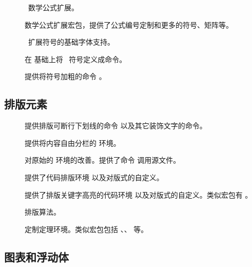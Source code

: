 \begin{description}
  \item[]  \AmS\ 数学公式扩展。
  \item[] 数学公式扩展宏包，提供了公式编号定制和更多的符号、矩阵等。
  \item[] \AmS\ 扩展符号的基础字体支持。
  \item[]  在  基础上将 \AmS\ 符号定义成命令。
  \item[]       提供将符号加粗的命令 。
\end{description}

\subsection{排版元素}\label{subsec:pkg-elements}

\begin{description}
  \item[]     提供排版可断行下划线的命令  以及其它装饰文字的命令。
  \item[] 提供将内容自由分栏的  环境。
  \item[] 对原始的  环境的改善。提供了命令  调用源文件。
  \item[] 提供了代码排版环境  以及对版式的自定义。
  \item[] 提供了排版关键字高亮的代码环境  以及对版式的自定义。类似宏包有 。
  \item[] 排版算法。
  \item[] 定制定理环境。类似宏包包括 、、 等。
\end{description}

\subsection{图表和浮动体}\label{subsec:pkg-tab-fig}

